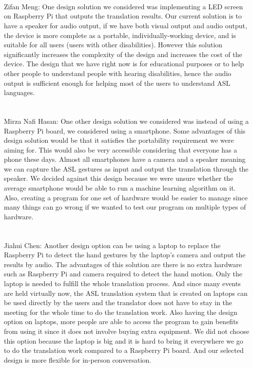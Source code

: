 \documentclass[12pt, titlepage]{article}
\begin{document}
\begin{enumerate}
  \\
  ~\\
  \\
  Zifan Meng: One design solution we considered was implementing a LED screen on Raspberry Pi that outputs the translation results. Our current solution 
  is to have a speaker for audio output, if we have both visual output and audio output, the device is more complete as a portable, individually-working 
  device, and is suitable for all users (users with other disabilities). However this solution significantly increases the complexity of the design and 
  increases the cost of the device. The design that we have right now is for educational purposes or to help other people to understand people with hearing disabilities, 
  hence the audio output is sufficient enough for helping most of the users to understand ASL languages.
  \\
  ~\\
  \\
    Mirza Nafi Hasan: One other design solution we considered was instead of using a Raspberry Pi board, we considered using a smartphone. Some advantages of 
    this design solution would be that it satisfies the portability requirement we were aiming for. This would also be very accessible considering that everyone
    has a phone these days. Almost all smartphones have a camera and a speaker meaning we can capture the ASL gestures as input and output the translation 
    through the speaker. We decided against this design because we were unsure whether the average smartphone would be able to run a machine learning algorithm
    on it. Also, creating a program for one set of hardware would be easier to manage since many things can go wrong if we wanted to test our program on 
    multiple types of hardware.
    \\
    ~\\
    \\
  Jiahui Chen: Another design option can be using a laptop to replace the Raspberry Pi to detect the hand gestures by the laptop's camera and output the results by audio. The advantages of this solution are there is no extra hardware such as Raspberry Pi and camera required to detect the hand motion. Only the laptop is needed to fulfill the whole translation process. And since many events are held virtually now, the ASL translation system that is created on laptops can be used directly by the users and the translator does not have to stay in the meeting for the whole time to do the translation work. Also having the design option on laptops, more people are able to access the program to gain benefits from using it since it does not involve buying extra equipment. We did not choose this option because the laptop is big and it is hard to  bring it everywhere we go to do the translation work compared to a Raspberry Pi board. And our selected design is more flexible for in-person conversation.  
  \\
\end{enumerate}
\end{document}
